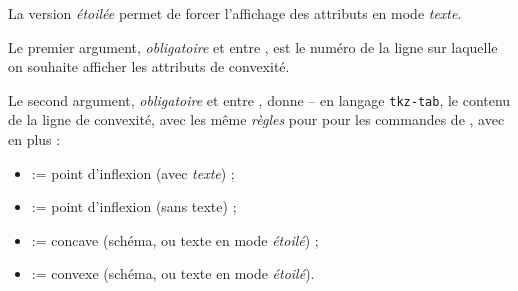 \begin{cautionblock}
La version \textit{étoilée} permet de forcer l'affichage des attributs en mode \textit{texte}.

Le premier argument, \textit{obligatoire} et entre , est le numéro de la ligne sur laquelle on souhaite afficher les attributs de convexité.

Le second argument, \textit{obligatoire} et entre , donne -- en langage \texttt{tkz-tab}, le contenu de la ligne de convexité, avec les même \textit{règles} pour pour les commandes de , avec en plus :

\begin{itemize}
	\item {} := point d'inflexion (avec \textit{texte}) ;
	\item {} := point d'inflexion (sans texte) ;
	\item {} := concave (schéma, ou texte en mode \textit{étoilé}) ;
	\item {} := convexe (schéma, ou texte en mode \textit{étoilé}).
\end{itemize}
\vspace*{-\baselineskip}\leavevmode
\end{cautionblock}

\begin{PresCodePL}{}
\end{PresCodePL}

\begin{PresCodePL}{}
\end{PresCodePL}

\begin{PresCodePL}{}
\end{PresCodePL}

